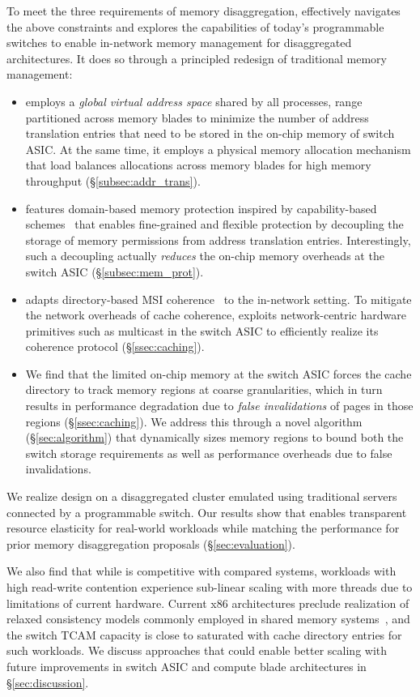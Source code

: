To meet the three requirements of memory disaggregation, \mind effectively navigates the above constraints and explores the capabilities of today's programmable switches to enable in-network memory management for disaggregated architectures. It does so through a principled redesign of traditional memory management:
\begin{itemize}[leftmargin=*, itemsep=0pt]
  \item \mind employs a \textit{global virtual address space} shared by all processes, range partitioned across memory blades to minimize the number of address translation entries that need to be stored in the on-chip memory of switch ASIC. At the same time, it employs a physical memory allocation mechanism that load balances allocations across memory blades for high memory throughput (\S\ref{subsec:addr_trans}).
  \item \mind features domain-based memory protection inspired by capability-based schemes~\cite{capabilityaddr, cap, opal} that enables fine-grained and flexible protection by decoupling the storage of memory permissions from address translation entries. Interestingly, such a decoupling actually \textit{reduces} the on-chip memory overheads at the switch ASIC (\S\ref{subsec:mem_prot}).
  \item \mind adapts directory-based MSI coherence~\cite{msi} to the in-network setting. To mitigate the network overheads of cache coherence, \mind exploits network-centric hardware primitives such as multicast in the switch ASIC to efficiently realize its coherence protocol (\S\ref{ssec:caching}).
  \item We find that the limited on-chip memory at the switch ASIC forces the cache directory to track memory regions at coarse granularities, which in turn results in performance degradation due to \textit{false invalidations} of pages in those regions (\S\ref{ssec:caching}). We address this through a novel \sizing algorithm (\S\ref{sec:algorithm}) that dynamically sizes memory regions to bound both the switch storage requirements as well as performance overheads due to false invalidations.
\end{itemize}
\noindent
We realize \mind design on a disaggregated cluster emulated using traditional servers connected by a programmable switch. Our results show that \mind enables transparent resource elasticity for real-world workloads while matching the performance for prior memory disaggregation proposals (\S\ref{sec:evaluation}). 

We also find that while \mind is competitive with compared systems, workloads with high read-write contention experience sub-linear scaling with more threads due to limitations of current hardware. Current x86 architectures preclude realization of relaxed consistency models commonly employed in shared memory systems~\cite{gam}, and the switch TCAM capacity is close to saturated with cache directory entries for such workloads. We discuss approaches that could enable better scaling with future improvements in switch ASIC and compute blade architectures in \S\ref{sec:discussion}.


